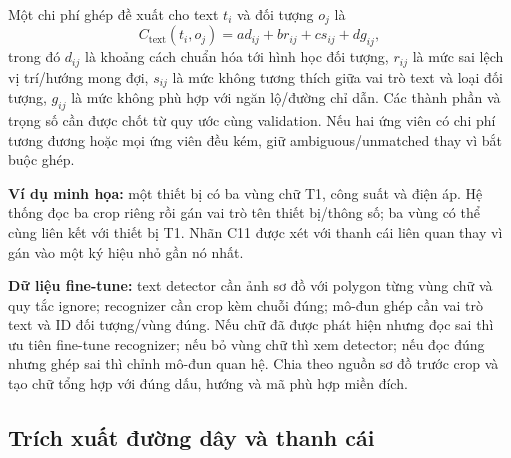 \documentclass[11pt,a4paper]{article}
\begin{document}
Một chi phí ghép đề xuất cho text $t_i$ và đối tượng $o_j$ là
\begin{equation}
 C_{\mathrm{text}}(t_i,o_j)=
 a d_{ij}+b r_{ij}+c s_{ij}+d g_{ij},
\end{equation}
trong đó $d_{ij}$ là khoảng cách chuẩn hóa tới hình học đối tượng, $r_{ij}$ là mức sai lệch vị trí/hướng mong đợi, $s_{ij}$ là mức không tương thích giữa vai trò text và loại đối tượng, $g_{ij}$ là mức không phù hợp với ngăn lộ/đường chỉ dẫn. Các thành phần và trọng số cần được chốt từ quy ước cùng validation. Nếu hai ứng viên có chi phí tương đương hoặc mọi ứng viên đều kém, giữ ambiguous/unmatched thay vì bắt buộc ghép.

\textbf{Ví dụ minh họa:} một thiết bị có ba vùng chữ T1, công suất và điện áp. Hệ thống đọc ba crop riêng rồi gán vai trò tên thiết bị/thông số; ba vùng có thể cùng liên kết với thiết bị T1. Nhãn C11 được xét với thanh cái liên quan thay vì gán vào một ký hiệu nhỏ gần nó nhất.

\textbf{Dữ liệu fine-tune:} text detector cần ảnh sơ đồ với polygon từng vùng chữ và quy tắc ignore; recognizer cần crop kèm chuỗi đúng; mô-đun ghép cần vai trò text và ID đối tượng/vùng đúng. Nếu chữ đã được phát hiện nhưng đọc sai thì ưu tiên fine-tune recognizer; nếu bỏ vùng chữ thì xem detector; nếu đọc đúng nhưng ghép sai thì chỉnh mô-đun quan hệ. Chia theo nguồn sơ đồ trước crop và tạo chữ tổng hợp với đúng dấu, hướng và mã phù hợp miền đích.

\subsection{Trích xuất đường dây và thanh cái}
\end{document}
